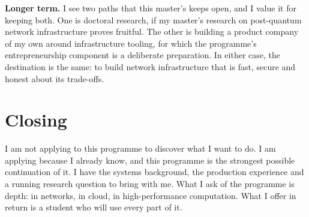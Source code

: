 \documentclass[11pt,a4paper]{article}
\begin{document}
\textbf{Longer term.} I see two paths that this master's keeps open, and I value it for keeping both. One is doctoral research, if my master's research on post-quantum network infrastructure proves fruitful. The other is building a product company of my own around infrastructure tooling, for which the programme's entrepreneurship component is a deliberate preparation. In either case, the destination is the same: to build network infrastructure that is fast, secure and honest about its trade-offs.

\section*{Closing}

I am not applying to this programme to discover what I want to do. I am applying because I already know, and this programme is the strongest possible continuation of it. I have the systems background, the production experience and a running research question to bring with me. What I ask of the programme is depth: in networks, in cloud, in high-performance computation. What I offer in return is a student who will use every part of it.
\end{document}
